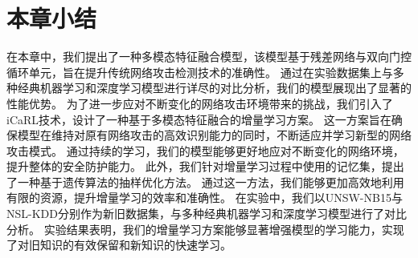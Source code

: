 \section{本章小结}
在本章中，我们提出了一种多模态特征融合模型，该模型基于残差网络与双向门控循环单元，旨在提升传统网络攻击检测技术的准确性。
通过在实验数据集上与多种经典机器学习和深度学习模型进行详尽的对比分析，我们的模型展现出了显著的性能优势。
为了进一步应对不断变化的网络攻击环境带来的挑战，我们引入了iCaRL技术，设计了一种基于多模态特征融合的增量学习方案。
这一方案旨在确保模型在维持对原有网络攻击的高效识别能力的同时，不断适应并学习新型的网络攻击模式。
通过持续的学习，我们的模型能够更好地应对不断变化的网络环境，提升整体的安全防护能力。
此外，我们针对增量学习过程中使用的记忆集，提出了一种基于遗传算法的抽样优化方法。
通过这一方法，我们能够更加高效地利用有限的资源，提升增量学习的效率和准确性。
在实验中，我们以UNSW-NB15与NSL-KDD分别作为新旧数据集，与多种经典机器学习和深度学习模型进行了对比分析。
实验结果表明，我们的增量学习方案能够显著增强模型的学习能力，实现了对旧知识的有效保留和新知识的快速学习。

